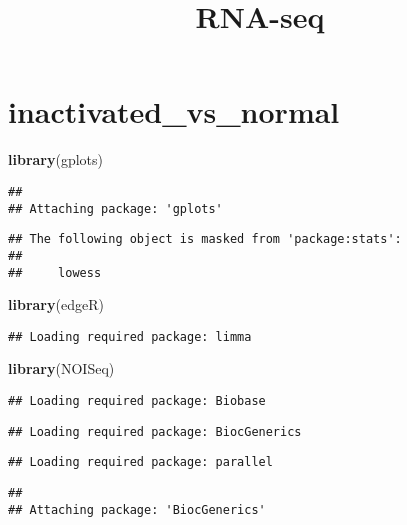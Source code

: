 \documentclass[]{article}
\title{RNA-seq}
\author{}
\date{}
\newenvironment{Shaded}{\begin{snugshade}}{\end{snugshade}}
\newcommand{\KeywordTok}[1]{\textcolor[rgb]{0.13,0.29,0.53}{\textbf{#1}}}
\newcommand{\NormalTok}[1]{#1}
\begin{document}
\maketitle

\section{inactivated\_vs\_normal}\label{inactivated_vs_normal}

\begin{Shaded}
\begin{Highlighting}[]
\KeywordTok{library}\NormalTok{(gplots)}
\end{Highlighting}
\end{Shaded}

\begin{verbatim}
## 
## Attaching package: 'gplots'
\end{verbatim}

\begin{verbatim}
## The following object is masked from 'package:stats':
## 
##     lowess
\end{verbatim}

\begin{Shaded}
\begin{Highlighting}[]
\KeywordTok{library}\NormalTok{(edgeR)}
\end{Highlighting}
\end{Shaded}

\begin{verbatim}
## Loading required package: limma
\end{verbatim}

\begin{Shaded}
\begin{Highlighting}[]
\KeywordTok{library}\NormalTok{(NOISeq)}
\end{Highlighting}
\end{Shaded}

\begin{verbatim}
## Loading required package: Biobase
\end{verbatim}

\begin{verbatim}
## Loading required package: BiocGenerics
\end{verbatim}

\begin{verbatim}
## Loading required package: parallel
\end{verbatim}

\begin{verbatim}
## 
## Attaching package: 'BiocGenerics'
\end{verbatim}
\end{document}
